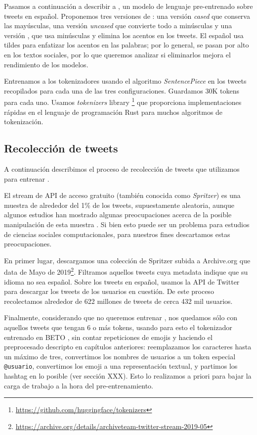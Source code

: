 Pasamos a continuación a describir a \robertuito{}, un modelo de lenguaje pre-entrenado sobre tweets en español. Proponemos tres versiones de \robertuito{}: una versión \emph{cased} que conserva las mayúsculas, una versión \emph{uncased} que convierte todo a minúsculas y una versión \deacc{}, que usa minúsculas y elimina los acentos en los tweets. El español usa tildes para enfatizar los acentos en las palabras; por lo general, se pasan por alto en los textos sociales, por lo que queremos analizar si eliminarlos mejora el rendimiento de los modelos.

Entrenamos a los tokenizadores usando el algoritmo \emph{SentencePiece} en los tweets recopilados para cada una de las tres configuraciones. Guardamos 30K tokens para cada uno. Usamos \emph{tokenizers} library \footnote{\url{https://github.com/huggingface/tokenizers}} que proporciona implementaciones rápidas en el lenguaje de programación Rust para muchos algoritmos de tokenización.


\subsection{Recolección de tweets}

A continuación describimos el proceso de recolección de tweets que utilizamos para entrenar \robertuito{}.

El stream de API de acceso gratuito (también conocida como \emph{Spritzer}) es una muestra de alrededor del 1\% de los tweets, supuestamente aleatoria, aunque algunos estudios han mostrado algunas preocupaciones acerca de la posible manipulación de esta muestra \cite{pfeffer2018tampering}. Si bien esto puede ser un problema para estudios de ciencias sociales computacionales, para nuestros fines descartamos estas preocupaciones.

En primer lugar, descargamos una colección de Spritzer subida a Archive.org que data de Mayo de 2019\footnote{\url{https://archive.org/details/archiveteam-twitter-stream-2019-05}}. Filtramos aquellos tweets cuya metadata indique que su idioma no sea español. Sobre los tweets en español, usamos la API de Twitter para descargar los tweets de los usuarios en cuestión. De este proceso recolectamos alrededor de 622 millones de tweets de cerca 432 mil usuarios.

Finalmente, considerando que no queremos entrenar , nos quedamos sólo con aquellos tweets que tengan 6 o más tokens, usando para esto el tokenizador entrenado en BETO \cite{canete2020spanish}, sin contar repeticiones de emojis y haciendo el preprocesado descripto en capítulos anteriores: reemplazamos los caracteres hasta un máximo de tres, convertimos los nombres de usuarios a un token especial \verb|@usuario|, convertimos los emoji a una representación textual, y partimos los hashtag en lo posible (ver sección XXX). Esto lo realizamos a priori para bajar la carga de trabajo a la hora del pre-entrenamiento.

